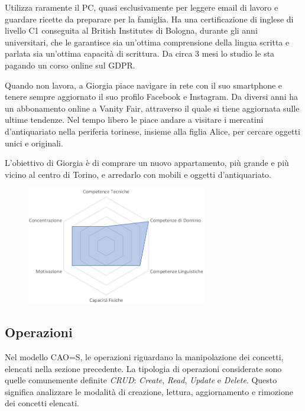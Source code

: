 \documentclass[12pt,italian,]{report}
\begin{document}
Utilizza raramente il PC, quasi esclusivamente per leggere email di
lavoro e guardare ricette da preparare per la famiglia. Ha una
certificazione di inglese di livello C1 conseguita al British Institutes
di Bologna, durante gli anni universitari, che le garantisce sia
un'ottima comprensione della lingua scritta e parlata sia un'ottima
capacità di scrittura. Da circa 3 mesi lo studio le sta pagando un corso
online sul GDPR.

Quando non lavora, a Giorgia piace navigare in rete con il suo
smartphone e tenere sempre aggiornato il suo profilo Facebook e
Instagram. Da diversi anni ha un abbonamento online a Vanity Fair,
attraverso il quale si tiene aggiornata sulle ultime tendenze. Nel tempo
libero le piace andare a visitare i mercatini d'antiquariato nella
periferia torinese, insieme alla figlia Alice, per cercare oggetti unici
e originali.

L'obiettivo di Giorgia è di comprare un nuovo appartamento, più grande e
più vicino al centro di Torino, e arredarlo con mobili e oggetti
d'antiquariato.

\begin{figure}[h]
\centering
\includegraphics[width=0.7\textwidth,height=\textheight]{img/giorgia_competenze.png}
\end{figure}

\hypertarget{operazioni}{%
\subsection{Operazioni}\label{operazioni}}

Nel modello CAO=S, le operazioni riguardano la manipolazione dei concetti, elencati nella sezione precedente. La tipologia di operazioni considerate sono quelle comunemente definite \emph{CRUD}: \emph{Create}, \emph{Read}, \emph{Update} e \emph{Delete}. Questo significa analizzare le modalità di creazione, lettura, aggiornamento e rimozione dei concetti elencati.
\end{document}
